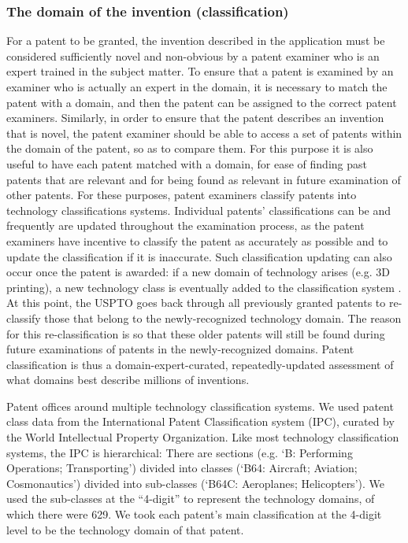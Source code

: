 \documentclass{dsj}
\begin{document}
\subsubsection*{The domain of the invention (classification)}
For a patent to be granted, the invention described in the application must be considered sufficiently novel and non-obvious by a patent examiner who is an expert trained in the subject matter. To ensure that a patent is examined by an examiner who is actually an expert in the domain, it is necessary to match the patent with a domain, and then the patent can be assigned to the correct patent examiners. Similarly, in order to ensure that the patent describes an invention that is novel, the patent examiner should be able to access a set of patents within the domain of the patent, so as to compare them. For this purpose it is also useful to have each patent matched with a domain, for ease of finding past patents that are relevant and for being found as relevant in future examination of other patents. For these purposes, patent examiners classify patents into technology classifications systems. Individual patents' classifications can be and frequently are updated throughout the examination process, as the patent examiners have incentive to classify the patent as accurately as possible and to update the classification if it is inaccurate. Such classification updating can also occur once the patent is awarded: if a new domain of technology arises (e.g. 3D printing), a new technology class is eventually added to the classification system \cite{Lafond2017}. At this point, the USPTO goes back through all previously granted patents to re-classify those that belong to the newly-recognized technology domain. The reason for this re-classification is so that these older patents will still be found during future examinations of patents in the newly-recognized domains. Patent classification is thus a domain-expert-curated, repeatedly-updated assessment of what domains best describe millions of inventions. 

Patent offices around multiple technology classification systems. We used patent class data from the International Patent Classification system (IPC), curated by the World Intellectual Property Organization. Like most technology classification systems, the IPC is hierarchical: There are sections (e.g. `B: Performing Operations; Transporting') divided into classes (`B64: Aircraft; Aviation; Cosmonautics') divided into sub-classes (`B64C: Aeroplanes; Helicopters'). We used the sub-classes at the ``4-digit'' to represent the technology domains, of which there were 629. We took each patent's main classification at the 4-digit level to be the technology domain of that patent. 
\end{document}
